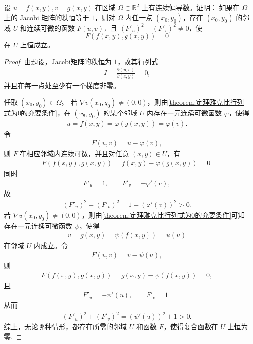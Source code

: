 \documentclass[../../main.tex]{subfiles}%
\begin{document}
\begin{example}
设 \( u = f(x, y), v = g(x, y) \) 在区域 \( \Omega \subset \mathbb{R}^2 \) 上有连续偏导数。证明：
如果在 \( \Omega \) 上的 Jacobi 矩阵的秩恒等于 \( 1 \)，则对 \( \Omega \) 内任一点 \( (x_0, y_0) \)，存在 \( (x_0, y_0) \) 的邻域 \( U \) 和连续可微的函数 \( F(u, v) \)，且 \( (F'_u)^2 + (F'_v)^2 \neq 0 \)，使
\[
F(f(x, y), g(x, y)) = 0
\]
在 \( U \) 上恒成立。
\end{example}
\begin{proof}
由题设，Jacobi矩阵的秩恒为 \( 1 \)，故其行列式
\begin{align*}
J = \frac{\partial (u, v)}{\partial (x, y)} = 0,
\end{align*}
并且在每一点处至少有一个梯度非零。

任取 \( (x_0, y_0) \in \Omega \)。
若 \( \nabla v(x_0, y_0) \ne (0, 0) \)，则由\cref{theorem:定理雅克比行列式为0的充要条件}，在 \( (x_0, y_0) \) 的某个邻域 \( U \) 内存在一元连续可微函数 \( \varphi \)，使得
\begin{align*}
u = f(x, y) = \varphi(g(x, y)) = \varphi(v).
\end{align*}
令
\begin{align*}
F(u, v) = u - \varphi(v),
\end{align*}
则 \( F \) 在相应邻域内连续可微，并且对任意 \( (x, y) \in U \)，有
\begin{align*}
F(f(x, y), g(x, y)) = f(x, y) - \varphi(g(x, y)) = 0.
\end{align*}
同时
\begin{align*}
F'_u = 1, \qquad F'_v = -\varphi'(v),
\end{align*}
故
\begin{align*}
(F'_u)^2 + (F'_v)^2 = 1 + (\varphi'(v))^2 > 0.
\end{align*}
若 \( \nabla u(x_0, y_0) \ne (0, 0) \)，则由\cref{theorem:定理雅克比行列式为0的充要条件}可知存在一元连续可微函数 \( \psi \)，使得
\begin{align*}
v = g(x, y) = \psi(f(x, y)) = \psi(u)
\end{align*}
在邻域 \( U \) 内成立。令
\begin{align*}
F(u, v) = v - \psi(u),
\end{align*}
则
\begin{align*}
F(f(x, y), g(x, y)) = g(x, y) - \psi(f(x, y)) = 0,
\end{align*}
且
\begin{align*}
F'_u = -\psi'(u), \qquad F'_v = 1,
\end{align*}
从而
\begin{align*}
(F'_u)^2 + (F'_v)^2 = (\psi'(u))^2 + 1 > 0.
\end{align*}
综上，无论哪种情形，都存在所需的邻域 \( U \) 和函数 \( F \)，使得复合函数在 \( U \) 上恒为零.
\end{proof}
\end{document}
